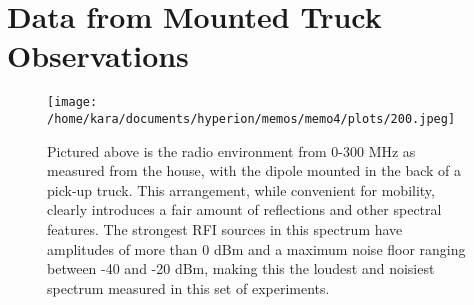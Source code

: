 \documentclass[11pt]{article}
\begin{document}
\section{Data from Mounted Truck Observations}

\begin{figure}[H]
    \begin{center}
    \texttt{[image: /home/kara/documents/hyperion/memos/memo4/plots/200.jpeg]}
    \end{center}
    \caption{
        Pictured above is the radio environment from 0-300 MHz as measured from 
        the house, with the dipole mounted in the back of a pick-up truck.  
        This arrangement, while convenient for mobility, clearly introduces a 
        fair amount of reflections and other spectral features. The strongest 
        RFI sources in this spectrum have amplitudes of more than 0 dBm and a 
        maximum noise floor ranging between -40 and -20 dBm, making this the 
        loudest and noisiest spectrum measured in this set of experiments.
    }
    \label{fig:200}
\end{figure}
\end{document}
